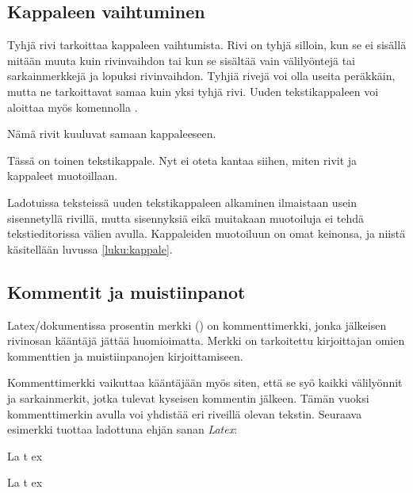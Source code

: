\subsection{Kappaleen vaihtuminen}
\label{luku:kappaleen_vaihtuminen}

Tyhjä rivi tarkoittaa kappaleen vaihtumista. Rivi on tyhjä silloin, kun
se ei sisällä mitään muuta kuin rivinvaihdon tai kun se sisältää vain
välilyöntejä tai sarkainmerkkejä ja lopuksi rivinvaihdon. Tyhjiä rivejä
voi olla useita peräkkäin, mutta ne tarkoittavat samaa kuin yksi tyhjä
rivi. Uuden tekstikappaleen voi aloittaa myös komennolla .

\begin{koodilohkosis}
Nämä rivit kuuluvat
samaan kappaleeseen.

Tässä on toinen tekstikappale.
Nyt ei oteta kantaa siihen, miten
rivit ja kappaleet muotoillaan.
\end{koodilohkosis}

Ladotuissa teksteissä uuden tekstikappaleen alkaminen ilmaistaan usein
sisennetyllä rivillä, mutta sisennyksiä eikä muitakaan muotoiluja ei
tehdä tekstieditorissa välien avulla. Kappaleiden muotoiluun on omat
keinonsa, ja niistä käsitellään luvussa \ref{luku:kappale}.

\subsection{Kommentit ja muistiinpanot}

Latex\-/dokumentissa prosentin merkki (\koodi{\%}) on kommenttimerkki,
jonka jälkeisen rivinosan kääntäjä jättää huomioimatta. Merkki on
tarkoitettu kirjoittajan omien kommenttien ja muistiinpanojen
kirjoittamiseen.

\begin{koodilohkosis}
\end{koodilohkosis}

Kommenttimerkki vaikuttaa kääntäjään myös siten, että se syö kaikki
välilyönnit ja sarkainmerkit, jotka tulevat kyseisen kommentin jälkeen.
Tämän vuoksi kommenttimerkin avulla voi yhdistää eri riveillä olevan
tekstin. Seuraava esimerkki tuottaa ladottuna ehjän sanan \emph{Latex}:

\begin{koodilohkosis}
La%
  t%
    ex
\end{koodilohkosis}

\begin{tulossis}
  La%
    t%
      ex
\end{tulossis}

